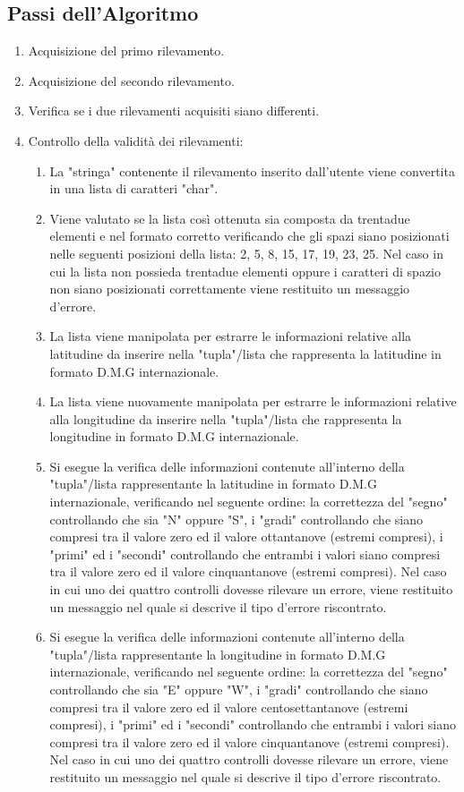 \documentclass{article}
\begin{document}
\subsection{Passi dell'Algoritmo}
\begin{enumerate}
	\item Acquisizione del primo rilevamento.
	\item Acquisizione del secondo rilevamento.
	\item Verifica se i due rilevamenti acquisiti siano differenti.
	
	\item Controllo della validità dei rilevamenti:
	\begin{enumerate}
		\item La "stringa" contenente il rilevamento inserito dall'utente viene convertita in una lista di caratteri "char".
		\item Viene valutato se la lista così ottenuta sia composta da trentadue elementi e nel formato corretto verificando che gli spazi siano posizionati nelle  seguenti posizioni della lista: 2, 5, 8, 15, 17, 19, 23, 25. Nel caso in cui la lista non possieda trentadue elementi oppure i caratteri di spazio non siano posizionati correttamente viene restituito un messaggio d'errore.
		\item La lista viene manipolata per estrarre le informazioni relative alla latitudine da inserire nella "tupla"/lista che rappresenta la latitudine in formato D.M.G internazionale.
		\item La lista viene nuovamente manipolata per estrarre le informazioni relative alla longitudine da inserire nella "tupla"/lista che rappresenta la longitudine in formato D.M.G internazionale.
		\item Si esegue la verifica delle informazioni contenute all'interno della "tupla"/lista rappresentante la latitudine in formato D.M.G internazionale, verificando nel seguente ordine:  la correttezza del "segno" controllando che sia "N" oppure "S", i "gradi" controllando che siano compresi tra il valore zero ed il valore ottantanove (estremi compresi), i "primi" ed i "secondi" controllando che entrambi i valori siano compresi tra il valore zero ed il valore cinquantanove (estremi compresi). Nel caso in cui uno dei quattro controlli dovesse rilevare un errore, viene restituito un messaggio nel quale si descrive il tipo d'errore riscontrato.
		\item Si esegue la verifica delle informazioni contenute all'interno della "tupla"/lista rappresentante la longitudine in formato D.M.G internazionale, verificando nel seguente ordine:  la correttezza del "segno" controllando che sia "E" oppure "W", i "gradi" controllando che siano compresi tra il valore zero ed il valore centosettantanove (estremi compresi), i "primi" ed i "secondi" controllando che entrambi i valori siano compresi tra il valore zero ed il valore cinquantanove (estremi compresi). Nel caso in cui uno dei quattro controlli dovesse rilevare un errore, viene restituito un messaggio nel quale si descrive il tipo d'errore riscontrato.
	\end{enumerate}


\end{enumerate}
\end{document}
